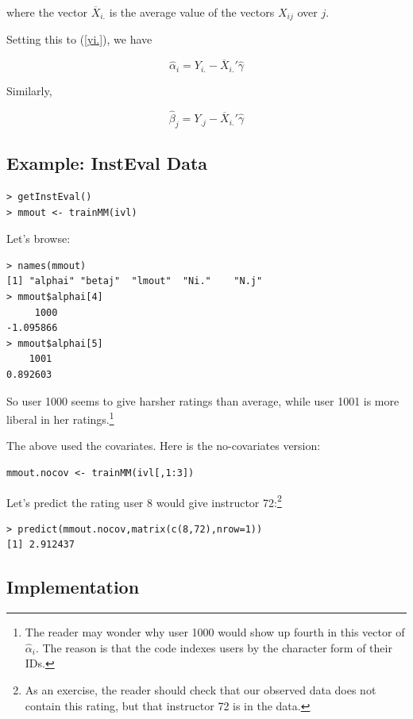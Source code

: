 where the vector $\overline{X}_{i.}$ is the average value of the vectors
$X_{ij}$ over $j$.

Setting this to (\ref{yi.}), we have

\begin{equation}
\widehat{\alpha}_i = 
Y_{i.} -
\overline{X}_{i.}' \widehat{\gamma} 
\end{equation}

Similarly,

\begin{equation}
\widehat{\beta}_j = 
Y_{.j} -
\overline{X}_{i.}' \widehat{\gamma} 
\end{equation}

\subsection{Example:  InstEval Data}

\begin{lstlisting}
> getInstEval()
> mmout <- trainMM(ivl)
\end{lstlisting}

Let's browse:

\begin{lstlisting}
> names(mmout)
[1] "alphai" "betaj"  "lmout"  "Ni."    "N.j" 
> mmout$alphai[4]
     1000 
-1.095866 
> mmout$alphai[5]
    1001 
0.892603 
\end{lstlisting}

So user 1000 seems to give harsher ratings than average, while user 1001
is more liberal in her ratings.\footnote{The reader may wonder why user
1000 would show up fourth in this vector of $\widehat{\alpha}_i$.  The
reason is that the code indexes users by the character form of their
IDs.}

The above used the covariates.  Here is the no-covariates version:

\begin{lstlisting}
mmout.nocov <- trainMM(ivl[,1:3])
\end{lstlisting}

Let's predict the rating user 8 would give instructor 72:\footnote{As an
exercise, the reader should check that our observed data does not
contain this rating, but that instructor 72 is in the data.}

\begin{lstlisting}
> predict(mmout.nocov,matrix(c(8,72),nrow=1))
[1] 2.912437
\end{lstlisting}

\subsection{Implementation}

